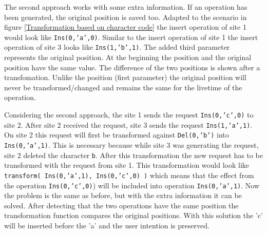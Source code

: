 \begin{itemize}
The second approach works with some extra information. If an operation has been generated, the original position is saved too. Adapted to the scenario in figure \ref{Transformation based on character code} the insert operation of site 1 would look like \texttt{Ins(0,'a',0)}. Similar to the insert operation of site 1 the insert operation of site 3 looks like \texttt{Ins(1,'b',1)}. The added third parameter represents the original position. At the beginning the position and the original position have the same value. The difference of the two positions is shown after a transfomation. Unlike the position (first parameter) the original position will never be transformed/changed and remains the same for the livetime of the operation.

Considering the second approach, the site 1 sends the request \texttt{Ins(0,'c',0)} to site 2. After site 2 received the request, site 3 sends the request \texttt{Ins(1,'a',1)}. On site 2 this request will first be transformed against \texttt{Del(0,'b')} into \texttt{Ins(0,'a',1)}. This is necessary because while site 3 was generating the request, site 2 deleted the character \texttt{b}. After this transformation the new request has to be transformed with the request from site 1. This transformation would look like \texttt{transform( Ins(0,'a',1), Ins(0,'c',0) )} which means that the effect from the operation \texttt{Ins(0,'c',0)}) will be included into operation \texttt{Ins(0,'a',1)}. Now the problem is the same as before, but with the extra information it can be solved. After detecting that the two operations have the same position the transformation function compares the original positions. With this solution the 'c' will be inserted before the 'a' and the user intention is preserved.


\end{itemize}
